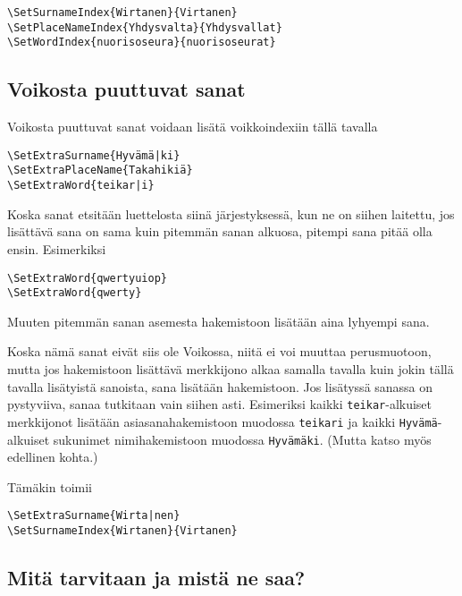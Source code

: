 \documentclass[12pt]{article}
\begin{document}
\begin{verbatim}
\SetSurnameIndex{Wirtanen}{Virtanen}
\SetPlaceNameIndex{Yhdysvalta}{Yhdysvallat}
\SetWordIndex{nuorisoseura}{nuorisoseurat}
\end{verbatim}


\subsection*{Voikosta puuttuvat sanat}

Voikosta puuttuvat sanat voidaan lisätä voikkoindexiin tällä tavalla

\begin{verbatim}
\SetExtraSurname{Hyvämä|ki}
\SetExtraPlaceName{Takahikiä}
\SetExtraWord{teikar|i}
\end{verbatim}

Koska sanat etsitään luettelosta siinä järjestyksessä, kun ne on
siihen laitettu, jos lisättävä sana on sama kuin pitemmän sanan
alkuosa, pitempi sana pitää olla ensin. Esimerkiksi

\begin{verbatim}
\SetExtraWord{qwertyuiop}
\SetExtraWord{qwerty}
\end{verbatim}

Muuten pitemmän sanan asemesta hakemistoon lisätään aina lyhyempi
sana.

Koska nämä sanat eivät siis ole Voikossa, niitä ei voi muuttaa
perusmuotoon, mutta jos hakemistoon lisättävä merkkijono alkaa samalla
tavalla kuin jokin tällä tavalla lisätyistä sanoista, sana lisätään
hakemistoon. Jos lisätyssä sanassa on pystyviiva, sanaa tutkitaan vain
siihen asti. Esimeriksi kaikki \verb=teikar=-alkuiset merkkijonot
lisätään asiasanahakemistoon muodossa \verb=teikari= ja kaikki
\verb=Hyvämä=-alkuiset sukunimet nimihakemistoon muodossa
\verb=Hyvämäki=. (Mutta katso myös edellinen kohta.)

Tämäkin toimii

\begin{verbatim}
\SetExtraSurname{Wirta|nen}
\SetSurnameIndex{Wirtanen}{Virtanen}
\end{verbatim}


\subsection*{Mitä tarvitaan ja mistä ne saa?}
\end{document}
